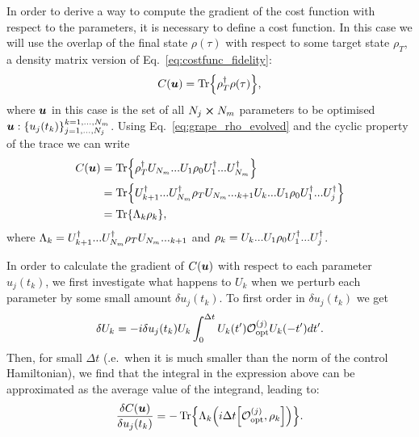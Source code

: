 In order to derive a way to compute the gradient of the cost function with respect to the parameters, it is necessary to define a cost function. In this case we will use the overlap of the final state $\rho(\tau)$ with respect to some target state $\rho_T$, a density matrix version of Eq.~\ref{eq:costfunc_fidelity}:
\begin{equation}
    C(\boldsymbol{u}) = \Tr{\rho_T^{\dagger}\rho(\tau)},
\end{equation}
where $\boldsymbol{u}$ in this case is the set of all $N_j \cross N_m$ parameters to be optimised $\boldsymbol{u}: \{ u_j(t_k)\}_{j = 1, ..., N_j}^{k = 1,...,N_m}$. Using Eq.~\ref{eq:grape_rho_evolved} and the cyclic property of the trace we can write
\begin{equation}\label{eq:grape_costfunc_rewrite}
    \begin{aligned}
        C(\boldsymbol{u} ) &= \Tr{\rho_T^{\dagger}U_{N_m} ... U_{1} \rho_0 U^{\dagger}_{1} ... U^{\dagger}_{N_m}} \\
        &=  \Tr{U^{\dagger}_{k+1} ... U^{\dagger}_{N_m} \rho_T U_{N_m} ... _{k+1} U_{k} ... U_{1} \rho_0 U^{\dagger}_{1} ... U^{\dagger}_{j}} \\
        &= \Tr{\Lambda_k \rho_k},
    \end{aligned}
\end{equation}
where $\Lambda_k = U^{\dagger}_{k+1} ... U^{\dagger}_{N_m} \rho_T U_{N_m} ... _{k+1}$ and $\rho_k = U_{k} ... U_{1} \rho_0 U^{\dagger}_{1} ... U^{\dagger}_{j}$. 

In order to calculate the gradient of $C(\boldsymbol{u})$ with respect to each parameter $u_j(t_k)$, we first investigate what happens to $U_k$ when we perturb each parameter by some small amount $\delta u_j(t_k)$. To first order in $\delta u_j(t_k)$ we get
\begin{equation}
    \delta U_k = -i \delta u_j(t_k) U_k \int_0^{\Delta t} U_k(t') \mathcal{O}_{\rm opt}^{(j)} U_k(-t') dt'.
\end{equation}
Then, for small $\Delta t$ (\@i.e.~when it is much smaller than the norm of the control Hamiltonian), we find that the integral in the expression above can be approximated as the average value of the integrand, leading to:
\begin{equation}\label{eq:grape_costfunc_gradient}
    \frac{\delta C(\ubb)}{\delta u_j(t_k)} = - \Tr{\Lambda_k \Big(i\Delta t \comm{\mathcal{O}_{\rm opt}^{(j)}}{\rho_k}\Big)}.
\end{equation}


